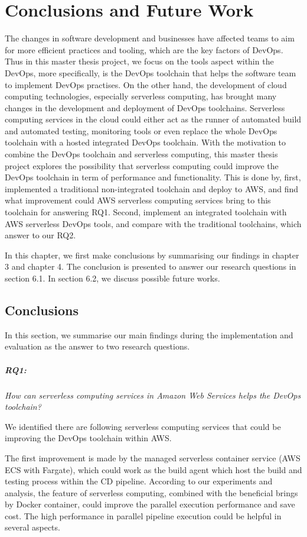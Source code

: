 \chapter{Conclusions and Future Work}
\label{chp:conclusionsandfuturework}
The changes in software development and businesses have affected teams to aim for more efficient practices and tooling, which are the key factors of DevOps. Thus in this master thesis project, we focus on the tools aspect within the DevOps, more specifically, is the DevOps toolchain that helps the software team to implement DevOps practises. On the other hand, the development of cloud computing technologies, especially serverless computing, has brought many changes in the development and deployment of DevOps toolchains. Serverless computing services in the cloud could either act as the runner of automated build and automated testing, monitoring tools or even replace the whole DevOps toolchain with a hosted integrated DevOps toolchain. With the motivation to combine the DevOps toolchain and serverless computing, this master thesis project explores the possibility that serverless computing could improve the DevOps toolchain in term of performance and functionality. 
This is done by, first, implemented a traditional non-integrated toolchain and deploy to AWS, and find what improvement could AWS serverless computing services bring to this toolchain for answering RQ1. Second, implement an integrated toolchain with AWS serverless DevOps tools, and compare with the traditional toolchains, which answer to our RQ2. 

In this chapter, we first make conclusions by summarising our findings in chapter 3 and chapter 4. The conclusion is presented to answer our research questions in section 6.1. In section 6.2, we discuss possible future works.
\section{Conclusions}
In this section, we summarise our main findings during the implementation and evaluation as the answer to two research questions.
\paragraph{RQ1:} \textit{How can serverless computing services in Amazon Web Services helps the DevOps toolchain?}
\medskip
\par
We identified there are following serverless computing services that could be improving the DevOps toolchain within AWS.
\par
The first improvement is made by the managed serverless container service (AWS ECS with Fargate), which could work as the build agent which host the build and testing process within the CD pipeline. According to our experiments and analysis, the feature of serverless computing, combined with the beneficial brings by Docker container, could improve the parallel execution performance and save cost. The high performance in parallel pipeline execution could be helpful in several aspects. 

